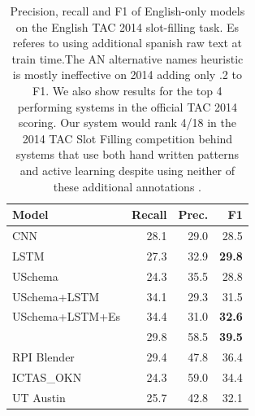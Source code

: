 \begin{table}[tb]
\begin{center}
\begin{tabular}{|lrrr|}
\hline
\bf Model & \bf Recall & \bf Prec. & \bf F1 \\
\hline\hline
CNN                 & 28.1 & 29.0 & 28.5 \\
LSTM                & 27.3 & 32.9 & \bf 29.8  \\
USchema             & 24.3 & 35.5 & 28.8 \\
\hline\hline
USchema+LSTM        & 34.1 & 29.3 & 31.5 \\
USchema+LSTM+Es        & 34.4 & 31.0 & \bf 32.6 \\
\hline\hline
\citet{angeli2014stanford} & 29.8 & 58.5 & \bf 39.5 \\
RPI Blender & 29.4 & 47.8 & 36.4 \\
ICTAS\_OKN & 24.3 & 59.0 & 34.4 \\
UT Austin & 25.7 & 42.8 & 32.1 \\
\hline
\end{tabular}
\caption{Precision, recall and F1 of English-only models on the English TAC 2014 slot-filling task. Es referes to using additional spanish raw text at train time.The AN alternative names heuristic is mostly ineffective on 2014 adding only .2 to F1. We also show results for the top 4 performing systems in the official TAC 2014 scoring. Our system would rank 4/18 in the 2014 TAC Slot Filling competition behind systems that use both hand written patterns and active learning despite using neither of these additional annotations \protect\citep{SurdeanuMihai2014}.\label{2014-en-tac-table}}
\end{center}
\end{table}





